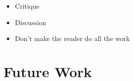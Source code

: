 \begin{itemize}
	\item Critique
	\item Discussion
	\item Don't make the reader do all the work
\end{itemize}
\section{Future Work}